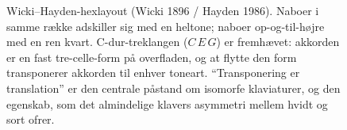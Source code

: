 \documentclass[10pt,letterpaper,twocolumn]{article}
\begin{document}
\begin{figure}[t]
{}
\caption{Wicki--Hayden-hexlayout (Wicki 1896 / Hayden 1986). Naboer i samme række adskiller sig med en heltone; naboer op-og-til-højre med en ren kvart. C-dur-treklangen ($C\,E\,G$) er fremhævet: akkorden er en fast tre-celle-form på overfladen, og at flytte den form transponerer akkorden til enhver toneart. ``Transponering er translation'' er den centrale påstand om isomorfe klaviaturer, og den egenskab, som det almindelige klavers asymmetri mellem hvidt og sort ofrer.}
\label{fig:wicki}
\end{figure}

\begin{figure}[t]
\centering
\begingroup
{}%
\end{figure}
\end{document}
